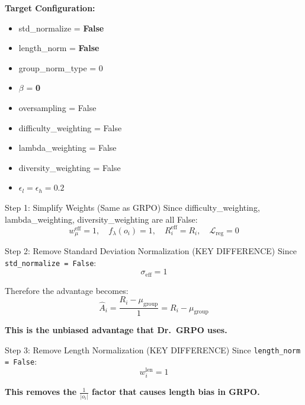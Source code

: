 \documentclass[11pt,a4paper]{article}
\begin{document}
\begin{configbox}
\textbf{Target Configuration:}
\begin{itemize}[noitemsep]
    \item std\_normalize = \textbf{False}
    \item length\_norm = \textbf{False}
    \item group\_norm\_type = 0
    \item $\beta$ = \textbf{0}
    \item oversampling = False
    \item difficulty\_weighting = False
    \item lambda\_weighting = False
    \item diversity\_weighting = False
    \item $\epsilon_l = \epsilon_h = 0.2$
\end{itemize}
\end{configbox}

\begin{proofbox}{Step 1: Simplify Weights (Same as GRPO)}
Since difficulty\_weighting, lambda\_weighting, diversity\_weighting are all False:
\begin{equation}
w_\mu^{\text{eff}} = 1, \quad f_\lambda(o_i) = 1, \quad R_i^{\text{eff}} = R_i, \quad \mathcal{L}_{\text{reg}} = 0
\end{equation}
\end{proofbox}

\begin{proofbox}{Step 2: Remove Standard Deviation Normalization (KEY DIFFERENCE)}
Since \texttt{std\_normalize = False}:
\begin{equation}
\sigma_{\text{eff}} = 1
\end{equation}

Therefore the advantage becomes:
\begin{equation}
\hat{A}_i = \frac{R_i - \mu_{\text{group}}}{1} = R_i - \mu_{\text{group}}
\end{equation}

\textbf{This is the unbiased advantage that Dr.~GRPO uses.}
\end{proofbox}

\begin{proofbox}{Step 3: Remove Length Normalization (KEY DIFFERENCE)}
Since \texttt{length\_norm = False}:
\begin{equation}
w_i^{\text{len}} = 1
\end{equation}

\textbf{This removes the $\frac{1}{|o_i|}$ factor that causes length bias in GRPO.}
\end{proofbox}
\end{document}
